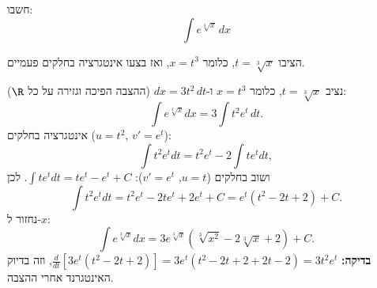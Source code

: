 
\begin{question}
חשבו:
\[ \int e^{\sqrt[3]{x}}\,dx \]
\end{question}

\begin{hint}
הציבו $t=\sqrt[3]x$, כלומר $x=t^3$, ואז בצעו אינטגרציה בחלקים פעמיים.
\end{hint}

\begin{solution}
נציב $t=\sqrt[3]x$, כלומר $x=t^3$ ו-$dx=3t^2\,dt$ (ההצבה הפיכה וגזירה על כל $\R$):
\[ \int e^{\sqrt[3]x}dx=3\int t^2e^t\,dt. \]
אינטגרציה בחלקים ($u=t^2$, $v'=e^t$):
\[ \int t^2e^tdt=t^2e^t-2\int te^tdt, \]
ושוב בחלקים ($u=t$, $v'=e^t$): $\int te^tdt=te^t-e^t+C$. לכן
\[ \int t^2e^tdt=t^2e^t-2te^t+2e^t+C=e^t(t^2-2t+2)+C. \]
נחזור ל-$x$:
\[ \boxed{\int e^{\sqrt[3]x}dx=3e^{\sqrt[3]x}\left(\sqrt[3]{x^2}-2\sqrt[3]x+2\right)+C.} \]
\textbf{בדיקה:} $\frac{d}{dt}\left[3e^t(t^2-2t+2)\right]=3e^t(t^2-2t+2+2t-2)=3t^2e^t$, וזה בדיוק האינטגרנד אחרי ההצבה.
\end{solution}
